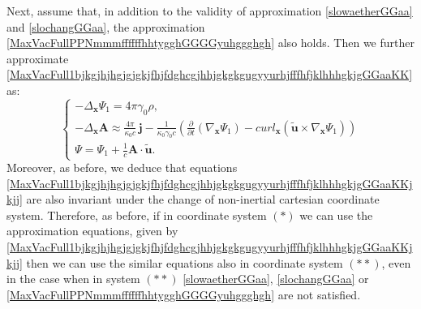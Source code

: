 \documentclass{article}
\theoremstyle{definition}
\theoremstyle{remark}
\renewcommand{\vec}[1]{\mathbf{#1}}
\newcommand{\er}{\eqref}
\newcommand{\er}{\eqref}
\begin{document}
Next, assume that, in addition to the validity of approximation
\er{slowaetherGGaa} and \er{slochangGGaa}, the approximation
\er{MaxVacFullPPNmmmffffffhhtygghGGGGyuhggghgh} also holds. Then we
further approximate
\er{MaxVacFull1bjkgjhjhgjgjgkjfhjfdghcgjhhjgkgkgugyyurhjfffhfjklhhhgkjgGGaaKK}
as:
\begin{equation}\label{MaxVacFull1bjkgjhjhgjgjgkjfhjfdghcgjhhjgkgkgugyyurhjfffhfjklhhhgkjgGGaaKKjkjj}
\begin{cases}
-\Delta_{\vec x}\Psi_1=4\pi\gamma_0\rho,\\
-\Delta_{\vec x}\vec A \approx \frac{4\pi}{\kappa_0 c}\,\vec
j-\frac{1}{\kappa_0\gamma_0 c}\left(\frac{\partial}{\partial
t}\left(\nabla_{\vec
x}\Psi_1\right)-curl_{\vec x}\left(\vec {\tilde u}\times\nabla_{\vec x}\Psi_1\right)\right)\\
\Psi=\Psi_1+\frac{1}{c}\vec A\cdot\vec {\tilde u}.
\end{cases}
\end{equation}
Moreover, as before, we deduce that equations
\er{MaxVacFull1bjkgjhjhgjgjgkjfhjfdghcgjhhjgkgkgugyyurhjfffhfjklhhhgkjgGGaaKKjkjj}
are also invariant under the change of non-inertial cartesian
coordinate system. Therefore, as before, if in coordinate system
$(*)$ we can use the approximation equations, given by
\er{MaxVacFull1bjkgjhjhgjgjgkjfhjfdghcgjhhjgkgkgugyyurhjfffhfjklhhhgkjgGGaaKKjkjj}
then we can use the similar equations
also in coordinate system $(**)$, even in the case when in system
$(**)$ \er{slowaetherGGaa}, \er{slochangGGaa} or
\er{MaxVacFullPPNmmmffffffhhtygghGGGGyuhggghgh} are not satisfied.
\end{document}

